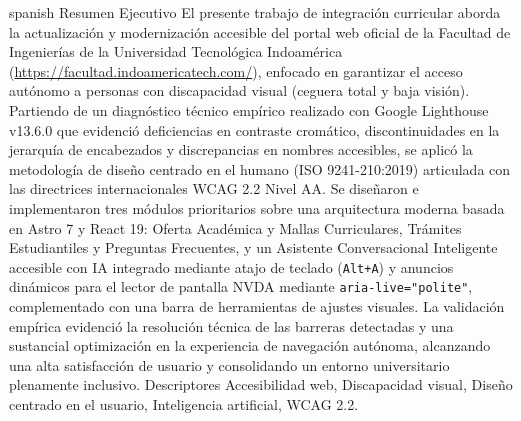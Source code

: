 \UTIResumenPagina
  {spanish}
  {Resumen Ejecutivo}
  {El presente trabajo de integración curricular aborda la actualización y modernización accesible del portal web oficial de la Facultad de Ingenierías de la Universidad Tecnológica Indoamérica (\url{https://facultad.indoamericatech.com/}), enfocado en garantizar el acceso autónomo a personas con discapacidad visual (ceguera total y baja visión). Partiendo de un diagnóstico técnico empírico realizado con Google Lighthouse v13.6.0 que evidenció deficiencias en contraste cromático, discontinuidades en la jerarquía de encabezados y discrepancias en nombres accesibles, se aplicó la metodología de diseño centrado en el humano (ISO 9241-210:2019) articulada con las directrices internacionales WCAG 2.2 Nivel AA. Se diseñaron e implementaron tres módulos prioritarios sobre una arquitectura moderna basada en Astro 7 y React 19: Oferta Académica y Mallas Curriculares, Trámites Estudiantiles y Preguntas Frecuentes, y un Asistente Conversacional Inteligente accesible con IA integrado mediante atajo de teclado (\texttt{Alt+A}) y anuncios dinámicos para el lector de pantalla NVDA mediante \texttt{aria-live="polite"}, complementado con una barra de herramientas de ajustes visuales. La validación empírica evidenció la resolución técnica de las barreras detectadas y una sustancial optimización en la experiencia de navegación autónoma, alcanzando una alta satisfacción de usuario y consolidando un entorno universitario plenamente inclusivo.}
  {Descriptores}
  {Accesibilidad web, Discapacidad visual, Diseño centrado en el usuario, Inteligencia artificial, WCAG 2.2.}
